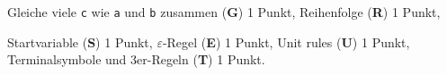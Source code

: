 \begin{bewertung}
\begin{teilaufgaben}
\item Gleiche viele \texttt{c} wie \texttt{a} und \texttt{b} zusammen
({\bf G}) 1 Punkt,
Reihenfolge ({\bf R}) 1 Punkt,
\item Startvariable ({\bf S}) 1 Punkt,
$\varepsilon$-Regel ({\bf E}) 1 Punkt,
Unit rules ({\bf U}) 1 Punkt,
Terminalsymbole und 3er-Regeln ({\bf T}) 1 Punkt.
\end{teilaufgaben}
\end{bewertung}

